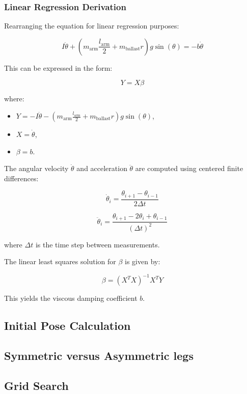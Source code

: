 \subsubsection{Linear Regression Derivation}
Rearranging the equation for linear regression purposes:

\[
    I \ddot{\theta} + (m_{\text{arm}} \frac{l_{\text{arm}}}{2} + m_{\text{ballast}} r) g \sin(\theta) = -b \dot{\theta}
\]

This can be expressed in the form:

\[
Y = X \beta
\]

where:
\begin{itemize}
    \item \( Y = -I \ddot{\theta} - (m_{\text{arm}} \frac{l_{\text{arm}}}{2} + m_{\text{ballast}} r) g \sin(\theta) \),
    \item \( X = \dot{\theta} \),
    \item \( \beta = b \).
\end{itemize}

The angular velocity \( \dot{\theta} \) and acceleration \( \ddot{\theta} \) are computed using centered finite differences:

\[
\dot{\theta}_i = \frac{\theta_{i+1} - \theta_{i-1}}{2\Delta t}
\]

\[
\ddot{\theta}_i = \frac{\theta_{i+1} - 2\theta_i + \theta_{i-1}}{(\Delta t)^2}
\]

where \(\Delta t\) is the time step between measurements.

The linear least squares solution for \( \beta \) is given by:

\[
\beta = (X^T X)^{-1} X^T Y
\]

This yields the viscous damping coefficient \( b \).




\subsection{Initial Pose Calculation}

\subsection{Symmetric versus Asymmetric legs}

\subsection{Grid Search}